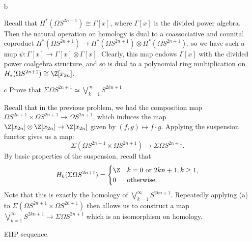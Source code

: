 \documentclass[11pt,letterpaper]{article}
\begin{document}
\begin{solution}
\begin{partproblem}{b}
    \end{partproblem}
    \quad Recall that $H^*(\Omega S^{2n+1})\cong \Gamma[x]$, where $\Gamma[x]$ is the divided power algebra. Then the natural operation on homology is dual to a coassociative and counital coproduct $H^*(\Omega S^{2n+1}) \to H^*(\Omega S^{2n+1})\otimes H^*(\Omega S^{2n+1})$, so we have such a map $\psi : \Gamma[x] \to \Gamma[x]\otimes \Gamma[x]$. Clearly, this map endows $\Gamma[x]$ with the divided power coalgebra structure, and so is dual to a polynomial ring multiplication on $H_*(\Omega S^{2n+1})\cong\Z[x_{2n}]$.

    \begin{partproblem}{c}
        Prove that $\Sigma \Omega S^{2n+1}\simeq \bigvee^\infty_{k=1}S^{2kn+1}$.
    \end{partproblem}

    \quad Recall that in the previous problem, we had the composition map $\Omega S^{2n+1}\times \Omega S^{2n+1} \to \Omega S^{2n+1}$, which induces the map $\Z[x_{2n}]\otimes \Z[x_{2n}] \to \Z[x_{2n}]$ given by $(f,g)\mapsto f\cdot g$. Applying the suspension functor gives us a map: \[\Sigma(\Omega S^{2n+1}\times \Omega S^{2n+1}) \to \Sigma\Omega S^{2n+1}.\]
    By basic properties of the suspension, recall that \[
        H_k(\Sigma\Omega S^{2n+1}) =\begin{cases}
            \Z & k=0 \textrm{ or } 2kn+1, k\geq 1,\\
            0 & \textrm{otherwise}.
        \end{cases}
    \]
    Note that this is exactly the homology of $\bigvee_{k=1}^\infty S^{2kn+1}$. Repeatedly applying (a) to $\Sigma(\Omega S^{2n+1}\times \Omega S^{2n+1})$ then allows us to construct a map $\bigvee^\infty_{k=1}S^{2kn+1}\to \Sigma \Omega S^{2n+1}$ which is an isomorphism on homology.
\end{solution}

\begin{problem}
    EHP sequence.
\end{problem}
\end{document}
